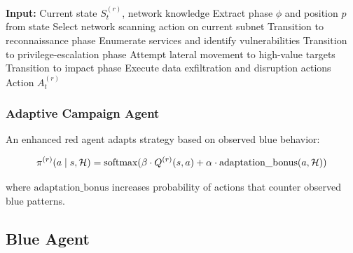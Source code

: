 \documentclass[12pt,oneside]{article}
\begin{document}
\begin{algorithm}
\caption{Deterministic Red Agent Policy}
\begin{algorithmic}[1]
\STATE \textbf{Input:} Current state $S_t^{(r)}$, network knowledge
\STATE Extract phase $\phi$ and position $p$ from state
    \STATE Select network scanning action on current subnet
        \STATE Transition to reconnaissance phase
    \ENDIF
{}
    \STATE Enumerate services and identify vulnerabilities
        \STATE Transition to privilege-escalation phase
    \ENDIF
{}
    \STATE Attempt lateral movement to high-value targets
        \STATE Transition to impact phase
    \ENDIF
{}
    \STATE Execute data exfiltration and disruption actions
\ENDIF
\RETURN Action $A_t^{(r)}$
\end{algorithmic}
\end{algorithm}

\subsubsection{Adaptive Campaign Agent}
An enhanced red agent adapts strategy based on observed blue behavior:

\begin{equation}
\pi^{(r)}(a \mid s, \mathcal{H}) = \text{softmax}(\beta \cdot Q^{(r)}(s, a) + \alpha \cdot \text{adaptation\_bonus}(a, \mathcal{H}))
\end{equation}

where $\text{adaptation\_bonus}$ increases probability of actions that counter observed blue patterns.

\subsection{Blue Agent}

\end{document}
